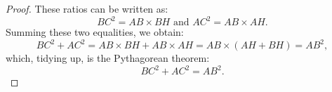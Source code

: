 \begin{proof}
These ratios can be written as:
\begin{equation}
    {BC}^{2}={AB}\times {BH} \text{ and }{AC}^{2}={AB}\times {AH}.
\end{equation}
Summing these two equalities, we obtain:
\begin{equation}
    {BC}^{2}+{AC}^{2}={AB}\times {BH}+{AB}\times {AH}={AB}\times({AH}+{BH})={AB}^{2} ,
\end{equation}
which, tidying up, is the Pythagorean theorem:
\begin{equation}
    {BC}^{2}+{AC}^{2}={AB}^{2}.
\end{equation}
\end{proof}
